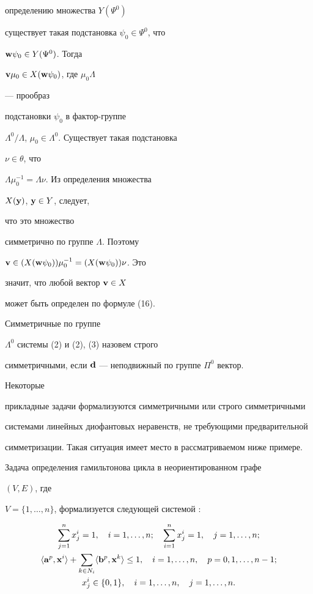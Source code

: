 \begin{pf}
определению множества $Y(\Psi^0)$


существует такая подстановка $\psi_0\in\Psi^0$, что


$\bold w\psi_0\in Y(\Psi^0)$. Тогда


$\bold v\mu_0\in X(\bold w\psi_0)$, где $\mu_0\Lambda$


--- прообраз


подстановки $\psi_0$ в фактор-группе


$\Lambda^0/\Lambda$, $\mu_0\in\Lambda^0$. Существует такая подстановка


$\nu\in\theta$, что


$\Lambda\mu^{-1}_0=\Lambda\nu$. Из определения множества


$X(\bold y)$, $\bold y\in Y$, следует,


что это множество


симметрично по группе $\Lambda$. Поэтому


$\bold v\in (X(\bold w\psi_0))\mu^{-1}_0=(X(\bold w\psi_0))\nu$. Это


значит, что любой вектор $\bold v\in X$


может быть определен по формуле (16).


\end{pf}





Симметричные по группе


$\Lambda^0$ системы (2) и (2), (3) назовем строго


симметричными, если $\bold d$ --- неподвижный по группе $\Pi^0$ вектор.


Некоторые


прикладные задачи формализуются симметричными или строго симметричными


системами линейных диофантовых неравенств, не требующими предварительной


симметризации. Такая ситуация имеет место в рассматриваемом ниже примере.





Задача определения гамильтонова цикла в неориентированном графе


$(V,E)$, где


$V=\{1,\dotsc,n\}$, формализуется следующей системой \cite{Vya}:


\begin{gather}


\sum^n_{j=1}x^i_j=1,\quad i=1,\dotsc,n;\quad


\sum^n_{i=1}x^i_j=1,\quad j=1,\dotsc,n;\\


\la\bold a^p,\bold x^i\ra+\sum_{k\in N_i}


\la\bold b^p,\bold x^k\ra\le 1,\quad i=1,\dotsc,n,\quad


p=0,1,\dotsc,n-1;\\


x^i_j\in\{0,1\},\quad i=1,\dotsc,n,\quad j=1,\dotsc,n.


\end{gather}


